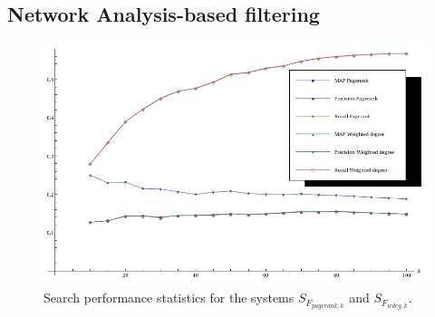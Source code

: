 \subsection{Network Analysis-based filtering}
\begin{figure}
\centering
\includegraphics[scale=.45]{filter:netana}
\caption{Search performance statistics for the systems $S_{F_{pagerank,k}}$ and $S_{F_{wdeg,k}}$.}
\label{filter:fig:netana}
\end{figure}
